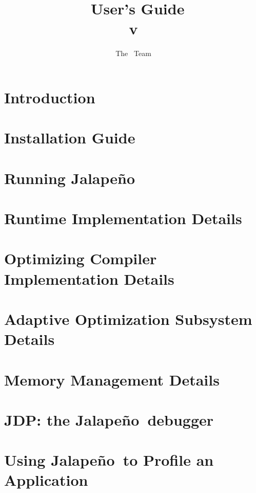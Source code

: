 \documentclass{article}
\title{\texonly{\vfill} {\huge \jp\ User's Guide} \\ {\huge v\version} \\ { } \texonly{\vfill}}
\author{{\huge The \jp\ Team}}
\newcommand{\jp}{Jalape\~{n}o}
\begin{document}
\maketitle
\date{}

\T \newpage
\label{hlxtoc}
\T \tableofcontents
\T \listoffigures
\W {}

\T \newpage
\section{Introduction}


\T \newpage
\section{Installation Guide} \label{section:installation}


\T \newpage
\section{Running \jp} \label{section:running}


\T \newpage
\section{Runtime Implementation Details}


\T \newpage
\section{Optimizing Compiler Implementation Details}
\label{section:optdetails}


\T \newpage
\section{Adaptive Optimization Subsystem Details}
\label{section:aosdetails}


\T \newpage
\section{Memory Management Details}


\T \newpage
\section{JDP: the \jp\ debugger}


\T \newpage
\section{Using \jp\ to Profile an Application}

\end{document}
